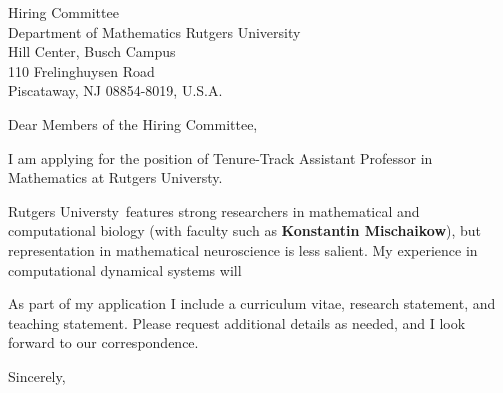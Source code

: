 \documentclass[11pt,a4paper]{letter}
\begin{document}
\def\School{Rutgers Universty}
\begin{letter}
{Hiring Committee\\
Department of Mathematics Rutgers University\\
Hill Center, Busch Campus\\
110 Frelinghuysen Road\\
Piscataway, NJ 08854-8019, U.S.A.}


\opening{Dear Members of the Hiring Committee,}

I am applying for the position of Tenure-Track Assistant Professor in Mathematics at \School. 



\School~features strong researchers in mathematical and computational biology (with faculty such as \textbf{Konstantin Mischaikow}), but representation in mathematical neuroscience is less salient. My experience in computational dynamical systems will 



As part of my application I include a curriculum vitae, research statement, and teaching statement. Please request additional details as needed, and I look forward to our correspondence.

\closing{Sincerely,}
\end{letter}
\end{document}
